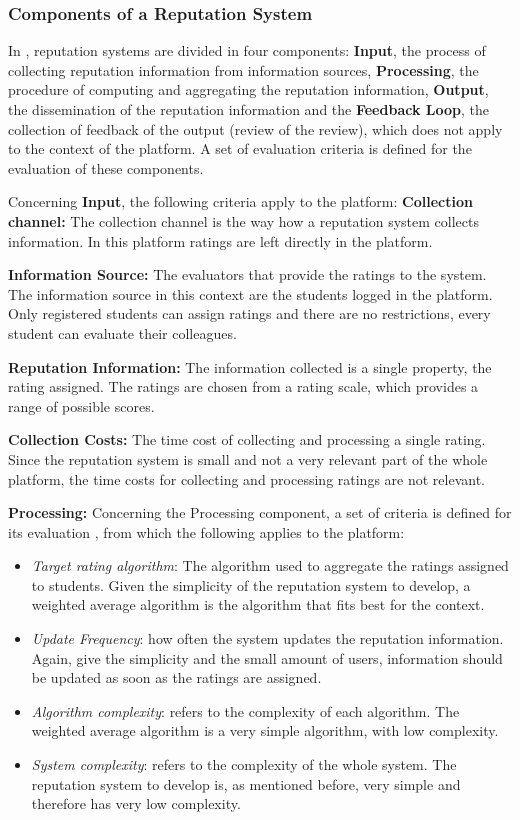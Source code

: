 \documentclass{llncs}
\begin{document}
\subsubsection{Components of a Reputation System}
In \cite{liu2012systematic,liu2010evaluation}, reputation systems are divided in four components: \textbf{Input}, the process of collecting reputation information from information sources, \textbf{Processing}, the procedure of computing and aggregating the reputation information, \textbf{Output}, the dissemination of the reputation information and the \textbf{Feedback Loop}, the collection of feedback of the output (review of the review), which does not apply to the context of the platform.
A set of evaluation criteria is defined for the evaluation of these components.

Concerning \textbf{Input}, the following criteria apply to the platform:
\textbf{Collection channel: }The collection channel is the way how a reputation system collects information. In this platform ratings are left directly in the platform.

\textbf{Information Source: }The evaluators that provide the ratings to the system. The information source in this context are the students logged in the platform. Only registered students can assign ratings and there are no restrictions, every student can evaluate their colleagues.

\textbf{Reputation Information: }The information collected is a single property, the rating assigned. The ratings are chosen from a rating scale, which provides a range of possible scores.

\textbf{Collection Costs: }The time cost of collecting and processing a single rating. Since the reputation system is small and not a very relevant part of the whole platform, the time costs for collecting and processing ratings are not relevant.

\textbf{Processing:}
Concerning the Processing component, a set of criteria is defined for its evaluation \cite{liu2012systematic}, from which the following applies to the platform:
\begin{itemize}
\item \textit{Target rating algorithm}: The algorithm used to aggregate the ratings assigned to students. Given the simplicity of the reputation system to develop, a weighted average algorithm is the algorithm that fits best for the context.
\item \textit{Update Frequency}: how often the system updates the reputation information. Again, give the simplicity and the small amount of users, information should be updated as soon as the ratings are assigned. 
\item \textit{Algorithm complexity}: refers to the complexity of each algorithm. The weighted average algorithm is a very simple algorithm, with low complexity.
\item \textit{System complexity}: refers to the complexity of the whole system. The reputation system to develop is, as mentioned before, very simple and therefore has very low complexity.
\end{itemize}
\end{document}
